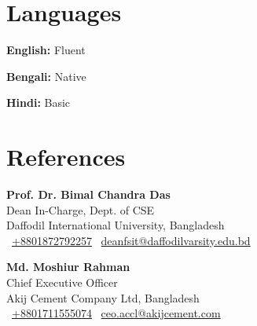 \documentclass[letterpaper,11pt]{article}
\newcommand{\resumeSubHeadingListStart}{\begin{itemize}[leftmargin=0.15in, label={}]}
\newcommand{\resumeSubHeadingListEnd}{\end{itemize}}
\begin{document}

\section{Languages}
  \vspace{-4pt} %
  \resumeSubHeadingListStart
    \small{\item{
        \textbf{English:}{ Fluent} \\ \vspace{-2pt} %
        
        \textbf{Bengali:}{ Native} \\ \vspace{-2pt} %
        
        \textbf{Hindi:}{ Basic}
    }}
  \resumeSubHeadingListEnd




\section{References}
  \vspace{-4pt} %
  \noindent
  \begin{minipage}[t]{0.48\textwidth}
    \small{
        \textbf{Prof. Dr. Bimal Chandra Das} \\
        Dean In-Charge, Dept. of CSE \\
        Daffodil International University, Bangladesh \\
        \faPhone\ \href{tel:+8801872792257}{+8801872792257} \quad \faAt\ \href{mailto:deanfsit@daffodilvarsity.edu.bd}{deanfsit@daffodilvarsity.edu.bd}
    }
  \end{minipage}
  \hfill
  \begin{minipage}[t]{0.48\textwidth}
    \small{
        \textbf{Md. Moshiur Rahman} \\
        Chief Executive Officer \\
        Akij Cement Company Ltd, Bangladesh \\
        \faPhone\ \href{tel:+8801711555074}{+8801711555074} \quad \faAt\ \href{mailto:ceo.accl@akijcement.com}{ceo.accl@akijcement.com}
    }
  \end{minipage}



\end{document}
